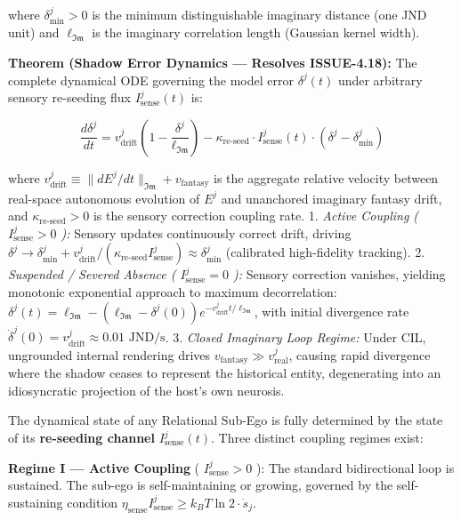 \documentclass[11pt,a4paper]{article}
\theoremstyle{definition}
\theoremstyle{remark}
\begin{document}
where $\delta_{\min}^j > 0$ is the minimum distinguishable imaginary distance (one JND unit) and $\ell_{\mathfrak{Im}}$ is the imaginary correlation length (Gaussian kernel width).

\textbf{Theorem (Shadow Error Dynamics — Resolves ISSUE-4.18):} The complete dynamical ODE governing the model error $\delta^j(t)$ under arbitrary sensory re-seeding flux $I_{\text{sense}}^j(t)$ is:


\begin{equation}
\boxed{\frac{d\delta^j}{dt} = v_{\text{drift}}^j \left(1 - \frac{\delta^j}{\ell_{\mathfrak{Im}}}\right) - \kappa_{\text{re-seed}} \cdot I_{\text{sense}}^j(t) \cdot \left(\delta^j - \delta_{\min}^j\right)}
\end{equation}


where $v_{\text{drift}}^j \equiv \|dE^j/dt\|_{\mathfrak{Im}} + v_{\text{fantasy}}$ is the aggregate relative velocity between real-space autonomous evolution of $E^j$ and unanchored imaginary fantasy drift, and $\kappa_{\text{re-seed}} > 0$ is the sensory correction coupling rate.
1. \textit{Active Coupling ( $I_{\text{sense}}^j > 0$ ):} Sensory updates continuously correct drift, driving $\delta^j \to \delta_{\min}^j + v_{\text{drift}}^j / (\kappa_{\text{re-seed}} I_{\text{sense}}^j) \approx \delta_{\min}^j$ (calibrated high-fidelity tracking).
2. \textit{Suspended / Severed Absence ( $I_{\text{sense}}^j = 0$ ):} Sensory correction vanishes, yielding monotonic exponential approach to maximum decorrelation: $\delta^j(t) = \ell_{\mathfrak{Im}} - (\ell_{\mathfrak{Im}} - \delta^j(0)) e^{-v_{\text{drift}}^j t / \ell_{\mathfrak{Im}}}$, with initial divergence rate $\dot{\delta}^j(0) = v_{\text{drift}}^j \approx 0.01\text{ JND/s}$.
3. \textit{Closed Imaginary Loop Regime:} Under CIL, ungrounded internal rendering drives $v_{\text{fantasy}} \gg v_{\text{real}}^j$, causing rapid divergence where the shadow ceases to represent the historical entity, degenerating into an idiosyncratic projection of the host's own neurosis.

The dynamical state of any Relational Sub-Ego is fully determined by the state of its \textbf{re-seeding channel} $I_{\text{sense}}^j(t)$. Three distinct coupling regimes exist:

\textbf{Regime I — Active Coupling} ( $I_{\text{sense}}^j > 0$ ): The standard bidirectional loop is sustained. The sub-ego is self-maintaining or growing, governed by the self-sustaining condition $\eta_{\text{sense}} I_{\text{sense}}^j \geq k_B T \ln 2 \cdot \dot{s}_j$.
\end{document}
